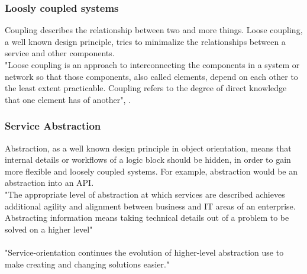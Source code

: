 \documentclass[12pt]{article}
\begin{document}
\subsubsection{Loosly coupled systems}
Coupling describes the relationship between two and more things. Loose coupling, a well known design principle,  tries to minimalize the relationships between a service and other components. \cite[page 87]{te} \\
"Loose coupling is an approach to interconnecting the components in a system or network so that those components, also called elements, depend on each other to the least extent practicable. Coupling refers to the degree of direct knowledge that one element has of another", \cite{loosecoupldef}.
\subsubsection{Service Abstraction}
Abstraction, as a well known design principle in object orientation, means that internal details or workflows of a logic block should be hidden, in order to gain more flexible and loosely coupled systems. \cite[page 87]{te} For example, abstraction would be an abstraction into an API.\\
"The appropriate level of abstraction at which services are described achieves additional agility and alignment between business and IT areas of an enterprise. Abstracting information means taking technical details out of a problem to be solved on a higher level"\cite[page 184]{grau}\\\\
"Service-orientation continues the evolution of higher-level abstraction use to make creating and changing solutions easier."\cite[page 184]{grau}
\end{document}
